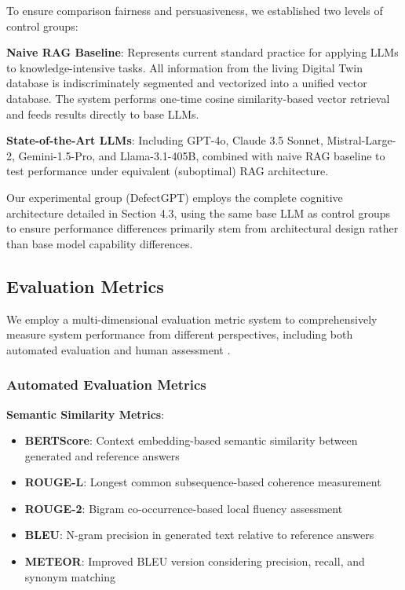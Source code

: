 To ensure comparison fairness and persuasiveness, we established two levels of control groups:

\textbf{Naive RAG Baseline}: Represents current standard practice for applying LLMs to knowledge-intensive tasks. All information from the living Digital Twin database is indiscriminately segmented and vectorized into a unified vector database. The system performs one-time cosine similarity-based vector retrieval and feeds results directly to base LLMs.

\textbf{State-of-the-Art LLMs}: Including GPT-4o, Claude 3.5 Sonnet, Mistral-Large-2, Gemini-1.5-Pro, and Llama-3.1-405B, combined with naive RAG baseline to test performance under equivalent (suboptimal) RAG architecture.

Our experimental group (DefectGPT) employs the complete cognitive architecture detailed in Section 4.3, using the same base LLM as control groups to ensure performance differences primarily stem from architectural design rather than base model capability differences.

\subsection{Evaluation Metrics}

We employ a multi-dimensional evaluation metric system to comprehensively measure system performance from different perspectives, including both automated evaluation and human assessment \cite{hernandez2022measuring}.

\subsubsection{Automated Evaluation Metrics}

\textbf{Semantic Similarity Metrics}:
\begin{itemize}
\item \textbf{BERTScore}: Context embedding-based semantic similarity between generated and reference answers
\item \textbf{ROUGE-L}: Longest common subsequence-based coherence measurement
\item \textbf{ROUGE-2}: Bigram co-occurrence-based local fluency assessment
\item \textbf{BLEU}: N-gram precision in generated text relative to reference answers
\item \textbf{METEOR}: Improved BLEU version considering precision, recall, and synonym matching
\end{itemize}

